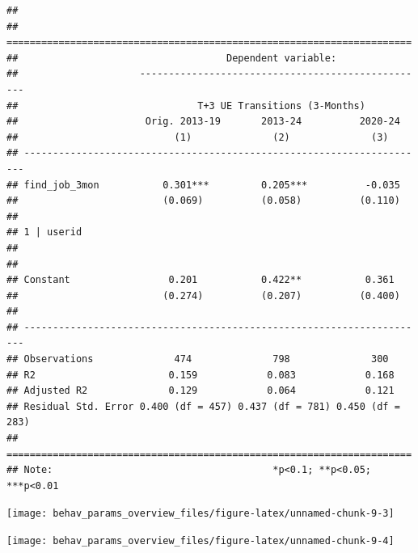 \documentclass[
]{article}
\begin{document}
\begin{verbatim}
## 
## ======================================================================
##                                    Dependent variable:                
##                     --------------------------------------------------
##                               T+3 UE Transitions (3-Months)           
##                      Orig. 2013-19       2013-24          2020-24     
##                           (1)              (2)              (3)       
## ----------------------------------------------------------------------
## find_job_3mon           0.301***         0.205***          -0.035     
##                         (0.069)          (0.058)          (0.110)     
##                                                                       
## 1 | userid                                                            
##                                                                       
##                                                                       
## Constant                 0.201           0.422**           0.361      
##                         (0.274)          (0.207)          (0.400)     
##                                                                       
## ----------------------------------------------------------------------
## Observations              474              798              300       
## R2                       0.159            0.083            0.168      
## Adjusted R2              0.129            0.064            0.121      
## Residual Std. Error 0.400 (df = 457) 0.437 (df = 781) 0.450 (df = 283)
## ======================================================================
## Note:                                      *p<0.1; **p<0.05; ***p<0.01
\end{verbatim}

\begin{center}\texttt{[image: behav\_params\_overview\_files/figure-latex/unnamed-chunk-9-3]} \end{center}

\begin{center}\texttt{[image: behav\_params\_overview\_files/figure-latex/unnamed-chunk-9-4]} \end{center}
\end{document}
